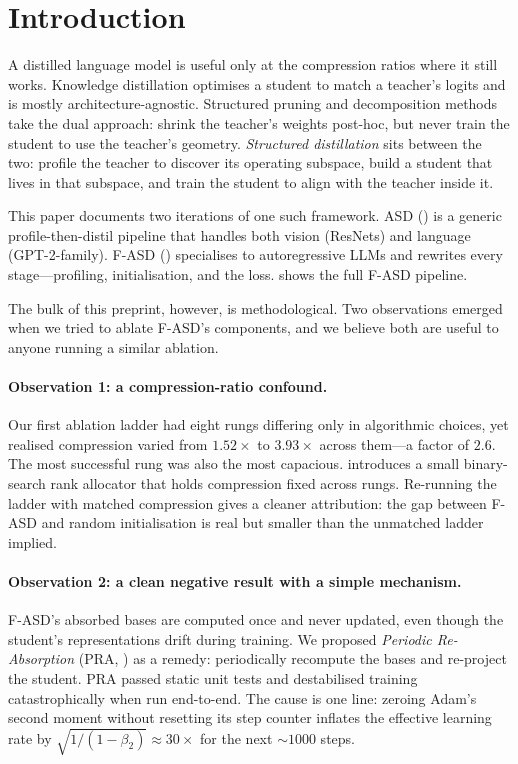 \documentclass[11pt]{article}
\newcommand{\fasd}{\textsc{F-ASD}}
\newcommand{\asd}{\textsc{ASD}}
\newcommand{\pra}{\textsc{PRA}}
\begin{document}
\section{Introduction}

A distilled language model is useful only at the compression ratios where
it still works. Knowledge distillation \citep{Hinton2015} optimises a
student to match a teacher's logits and is mostly architecture-agnostic.
Structured pruning and decomposition methods
\citep{Sun2023Wanda,Frantar2023SparseGPT,Sharma2024LASER,Kaushal2023LoRD}
take the dual approach: shrink the teacher's weights post-hoc, but never
train the student to use the teacher's geometry. \emph{Structured
distillation} sits between the two: profile the teacher to discover its
operating subspace, build a student that lives in that subspace, and
train the student to align with the teacher inside it.

This paper documents two iterations of one such framework. \asd{}
() is a generic profile-then-distil pipeline that handles
both vision (ResNets) and language (GPT-2-family). \fasd{} ()
specialises to autoregressive LLMs and rewrites every stage---profiling,
initialisation, and the loss.  shows the full \fasd{}
pipeline.

The bulk of this preprint, however, is methodological. Two observations
emerged when we tried to ablate \fasd{}'s components, and we believe both
are useful to anyone running a similar ablation.

\paragraph{Observation 1: a compression-ratio confound.}
Our first ablation ladder had eight rungs differing only in algorithmic
choices, yet realised compression varied from $1.52\times$ to $3.93\times$
across them---a factor of $2.6$. The most successful rung was also the
most capacious.  introduces a small binary-search
rank allocator that holds compression fixed across rungs. Re-running the
ladder with matched compression gives a cleaner attribution: the gap
between \fasd{} and random initialisation is real but smaller than the
unmatched ladder implied.

\paragraph{Observation 2: a clean negative result with a simple mechanism.}
\fasd{}'s absorbed bases are computed once and never updated, even though
the student's representations drift during training. We proposed
\emph{Periodic Re-Absorption} (\pra{}, ) as a remedy:
periodically recompute the bases and re-project the student. \pra{}
passed static unit tests and destabilised training catastrophically when
run end-to-end. The cause is one line: zeroing Adam's second moment
without resetting its step counter inflates the effective learning rate
by $\sqrt{1/(1{-}\beta_2)}\!\approx\!30\times$ for the next $\sim$$1000$
steps.
\end{document}
